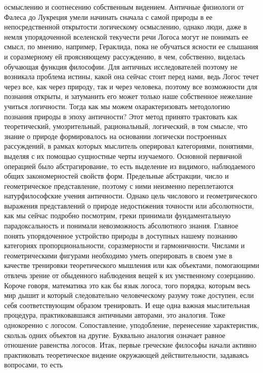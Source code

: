 осмыслению и соотнесению собственным видением. Античные физиологи от Фалеса до
Лукреция умели начинать сначала с самой природы в ее непосредственной открытости
логическому осмыслению, однако люди, даже в немля упорядоченной вселенской
текучести речи Логоса могут не понимать ее смысл, по мнению, например,
Гераклида, пока не обучаться ясности ее слышания и соразмерному ей проясняющему
рассуждению, в чем, собственно, виделась обучающая функция философии. Для
античных исследователей поэтому не возникала проблема истины, какой она сейчас
стоит перед нами, ведь Логос течет через все, как через природу, так и через
человека, поэтому все возможности для познания открыты, и затуманить его может
только наше собственное нежелание учиться логичности. Тогда как мы можем
охарактеризовать методологию познания природы в эпоху античности? Этот метод
принято трактовать как теоретический, умозрительный, рациональный, логический, в
том смысле, что знание о природе формировалось на основании логически
построенных рассуждений, в рамках которых мыслитель оперировал категориями,
понятиями, выделяя с их помощью сущностные черты изучаемого. Основной первичной
операцией было абстрагирование, то есть выделение из видимого, наблюдаемого
общих закономерностей свойств форм. Предельные абстракции, число и
геометрическое представление, поэтому с ними неизменно переплетаются
натурфилософские учения античности. Однако цель числового и геометрического
выражения представлений о природе недостижения точности или абсолютности, как мы
сейчас подробно посмотрим, греки принимали фундаментальную парадоксальность и
понимали невозможность абсолютного знания. Главное понять упорядоченное
устройство природы в доступных нашему познанию категориях пропорциональности,
соразмерности и гармоничности. Числами и геометрическими фигурами необходимо
уметь оперировать в своем уме в качестве тренировки теоретического мышления или
как объектами, помогающими отвлечь зрение от обыденного наблюдения вещей к их
умственному созерцанию. Короче говоря, математика это как бы язык логоса, того
порядка, которым весь мир дышит и который следовательно человеческому разуму
тоже доступен, если себя соответствующим образом тренировать. И еще одна важная
мыслительная процедура, практиковавшаяся античными авторами, это аналогия. Тоже
однокоренно с логосом. Сопоставление, уподобление, перенесение характеристик,
скользь одних объектов на другие. Буквально аналогия означает равное отношение
равенства логосов. Итак, первые греческие философы начали активно практиковать
теоретическое видение окружающей действительности, задаваясь вопросами, то есть

